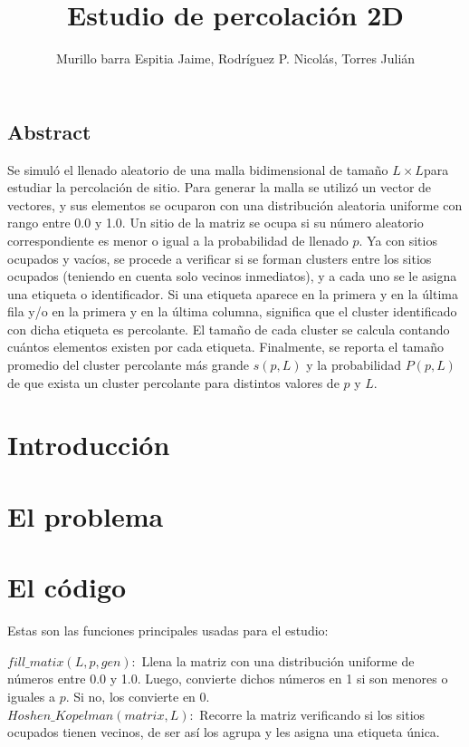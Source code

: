 \documentclass[10pt,twocolumn]{article}
\title{Estudio de percolación 2D}
\author{Murillo barra Espitia Jaime, Rodríguez P. Nicolás, Torres Julián}
\begin{document}
\maketitle

\subsection*{Abstract}
    Se simuló el llenado aleatorio de una malla bidimensional de tamaño $L\times L$para estudiar la percolación de sitio. Para generar la malla se
    utilizó un vector de vectores, y sus elementos se ocuparon con una distribución aleatoria uniforme con rango entre 0.0 y 1.0.
    Un sitio de la matriz se ocupa si su número aleatorio correspondiente es menor o igual a la probabilidad de llenado $p$.
    Ya con sitios ocupados y vacíos, se procede a verificar si se forman clusters entre los sitios ocupados (teniendo en cuenta
    solo vecinos inmediatos), y a cada uno se le asigna una etiqueta o identificador. Si una etiqueta aparece en la primera y en la última fila
    y/o en la primera y en la última columna, significa que el cluster identificado con dicha etiqueta es percolante. El tamaño de cada cluster
    se calcula contando cuántos elementos existen por cada etiqueta. Finalmente, se reporta el tamaño promedio del cluster percolante más grande
    $s(p, L)$ y la probabilidad $P(p, L)$ de que exista un cluster percolante para distintos valores de $p$ y $L$.

\section{Introducción}
    
\section{El problema} 
    
\section{El código}
    Estas son las funciones principales usadas para el estudio:

    $fill\_matix(L, p, gen):$ Llena la matriz con una distribución uniforme de números entre 0.0 y 1.0. Luego, convierte
    dichos números en 1 si son menores o iguales a $p$. Si no, los convierte en 0.\\ 

    $Hoshen\_Kopelman(matrix, L):$ Recorre la matriz verificando si los sitios ocupados tienen vecinos, de ser así los agrupa
    y les asigna una etiqueta única.\\
\end{document}
